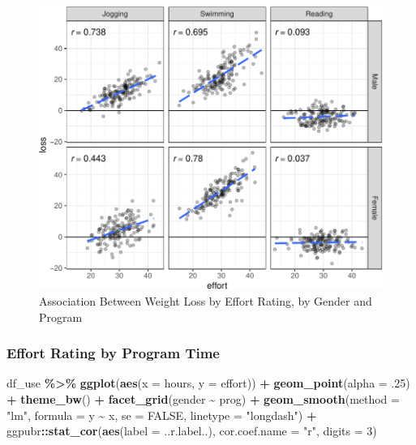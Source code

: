 \documentclass[
]{article}
\newenvironment{Shaded}{\begin{snugshade}}{\end{snugshade}}
\newcommand{\AttributeTok}[1]{\textcolor[rgb]{0.13,0.29,0.53}{#1}}
\newcommand{\ConstantTok}[1]{\textcolor[rgb]{0.56,0.35,0.01}{#1}}
\newcommand{\DecValTok}[1]{\textcolor[rgb]{0.00,0.00,0.81}{#1}}
\newcommand{\FunctionTok}[1]{\textcolor[rgb]{0.13,0.29,0.53}{\textbf{#1}}}
\newcommand{\NormalTok}[1]{#1}
\newcommand{\SpecialCharTok}[1]{\textcolor[rgb]{0.81,0.36,0.00}{\textbf{#1}}}
\newcommand{\StringTok}[1]{\textcolor[rgb]{0.31,0.60,0.02}{#1}}
\begin{document}
\begin{figure}[hb]

\includegraphics{Appendix_ex_weightloss_files/figure-latex/unnamed-chunk-65-1} \hfill{}

\caption{Association Between Weight Loss by Effort Rating, by Gender and Program}\label{fig:unnamed-chunk-65}
\end{figure}

\clearpage

\hypertarget{effort-rating-by-program-time}{%
\subsubsection{Effort Rating by Program
Time}\label{effort-rating-by-program-time}}

\begin{Shaded}
\begin{Highlighting}[]
\NormalTok{df\_use }\SpecialCharTok{\%\textgreater{}\%} 
  \FunctionTok{ggplot}\NormalTok{(}\FunctionTok{aes}\NormalTok{(}\AttributeTok{x =}\NormalTok{ hours,}
             \AttributeTok{y =}\NormalTok{ effort)) }\SpecialCharTok{+}
  \FunctionTok{geom\_point}\NormalTok{(}\AttributeTok{alpha =}\NormalTok{ .}\DecValTok{25}\NormalTok{) }\SpecialCharTok{+}
  \FunctionTok{theme\_bw}\NormalTok{() }\SpecialCharTok{+}
  \FunctionTok{facet\_grid}\NormalTok{(gender }\SpecialCharTok{\textasciitilde{}}\NormalTok{ prog) }\SpecialCharTok{+}
  \FunctionTok{geom\_smooth}\NormalTok{(}\AttributeTok{method =} \StringTok{"lm"}\NormalTok{,}
              \AttributeTok{formula =}\NormalTok{ y }\SpecialCharTok{\textasciitilde{}}\NormalTok{ x,}
              \AttributeTok{se =} \ConstantTok{FALSE}\NormalTok{,}
              \AttributeTok{linetype =} \StringTok{"longdash"}\NormalTok{) }\SpecialCharTok{+}
\NormalTok{  ggpubr}\SpecialCharTok{::}\FunctionTok{stat\_cor}\NormalTok{(}\FunctionTok{aes}\NormalTok{(}\AttributeTok{label =}\NormalTok{ ..r.label..),}
                   \AttributeTok{cor.coef.name =} \StringTok{"r"}\NormalTok{,}
                   \AttributeTok{digits =} \DecValTok{3}\NormalTok{)}
\end{Highlighting}
\end{Shaded}
\end{document}

